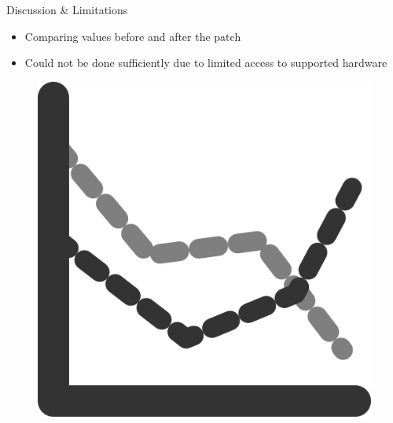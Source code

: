 \documentclass[aspectratio=169]{beamer}
[aspectratio=169] %
\begin{document}
\begin{frame}{Discussion \& Limitations}
  \begin{minipage}{0.49\textwidth} 
    \begin{itemize}
      \item Comparing values before and after the patch
      \item Could not be done sufficiently due to limited access to supported hardware
    \end{itemize}
  \end{minipage}
  \hfill
  \begin{minipage}{0.49\textwidth} 
    \begin{figure}
      \centering
      \includegraphics[height=0.5\textheight]{figures/graph.png}
    \end{figure}
  \end{minipage}
\end{frame}

\section*{}
\end{document}
